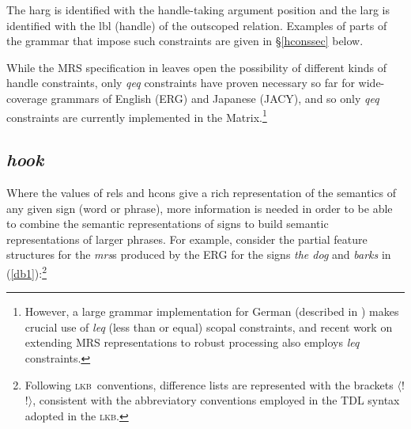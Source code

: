 \documentclass[12pt]{article}
\newcommand{\lkb}{\textsc{lkb}}
\newcommand{\fn}{\footnote}
\begin{document}
\noindent
The {\sc harg} is identified with the handle-taking argument position
and the {\sc larg} is identified with the {\sc lbl} (handle) of the outscoped
relation.  Examples of parts of the grammar that impose such constraints
are given in \S\ref{hconssec} below.

While the MRS specification in  leaves
open the possibility of different kinds of handle constraints, only
{\it qeq} constraints have proven necessary so far for wide-coverage
grammars of English (ERG) and Japanese (JACY), and so only
{\it qeq} constraints are currently implemented in the
Matrix.\footnote{However, a large grammar implementation for German
(described in )
makes crucial use of {\it leq} (less than or equal) scopal
constraints, and recent work on extending MRS representations to robust
processing \cite{Cop:03} also employs {\it leq} constraints.}

\subsection{{\it hook}}
\label{hooksec}

Where the values of {\sc rels} and {\sc hcons} give a rich representation of
the semantics of any given sign (word or phrase),
more information is needed in order to be able to combine the semantic
representations of signs to build
semantic representations of larger phrases.  For example, consider the
partial feature structures for the {\it mrs}s produced by the ERG for the
signs {\it the dog} and {\it barks} in
(\ref{db1}):\fn{Following \lkb\ conventions, difference lists are
represented with the brackets $\langle$! !$\rangle$, consistent with the
abbreviatory conventions employed in the TDL \cite{Kri:Sch:94}
syntax adopted in the \lkb.}
\end{document}
